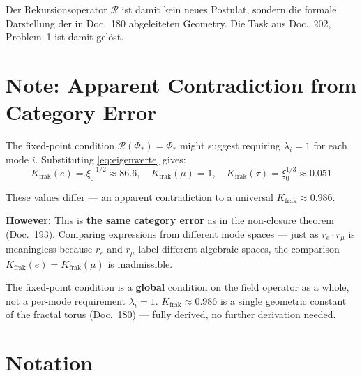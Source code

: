 Der Rekursionsoperator $\mathcal{R}$ ist damit kein neues Postulat,
sondern die formale Darstellung der in Doc.~180 abgeleiteten
Geometry. Die Task aus Doc.~202, Problem~1 ist damit gelöst.

\medskip\noindent
\section{Note: Apparent Contradiction from Category Error}

The fixed-point condition $\mathcal{R}(\Phi_*) = \Phi_*$ might suggest
requiring $\lambda_i = 1$ for each mode $i$. Substituting
\eqref{eq:eigenwerte} gives:
\[
  K_{\text{frak}}(e) = \xi_0^{-1/2} \approx 86.6, \quad
  K_{\text{frak}}(\mu) = 1, \quad
  K_{\text{frak}}(\tau) = \xi_0^{1/3} \approx 0.051
\]

These values differ --- an apparent contradiction to a universal
$K_{\text{frak}} \approx 0.986$.

\textbf{However:} This is \textbf{the same category error}
as in the non-closure theorem (Doc.~193). Comparing expressions
from different mode spaces --- just as $r_e \cdot r_\mu$ is
meaningless because $r_e$ and $r_\mu$ label different algebraic
spaces, the comparison $K_{\text{frak}}(e) = K_{\text{frak}}(\mu)$
is inadmissible.

The fixed-point condition is a \textbf{global} condition on the field
operator as a whole, not a per-mode requirement $\lambda_i = 1$.
$K_{\text{frak}} \approx 0.986$ is a single geometric constant
of the fractal torus (Doc.~180) --- fully derived, no further
derivation needed.


\section*{Notation}

